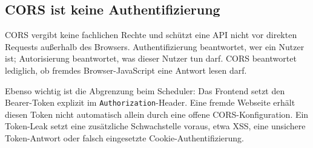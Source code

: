 \subsection{CORS ist keine Authentifizierung}

CORS vergibt keine fachlichen Rechte und schützt eine API nicht vor
direkten Requests außerhalb des Browsers. Authentifizierung
beantwortet, wer ein Nutzer ist; Autorisierung beantwortet, was
dieser Nutzer tun darf. CORS beantwortet lediglich, ob fremdes
Browser-JavaScript eine Antwort lesen darf.

Ebenso wichtig ist die Abgrenzung beim Scheduler: Das Frontend setzt
den Bearer-Token explizit im \texttt{Authorization}-Header. Eine
fremde Webseite erhält diesen Token nicht automatisch allein durch
eine offene CORS-Konfiguration. Ein Token-Leak setzt eine zusätzliche
Schwachstelle voraus, etwa XSS, eine unsichere Token-Antwort oder
falsch eingesetzte Cookie-Authentifizierung.

